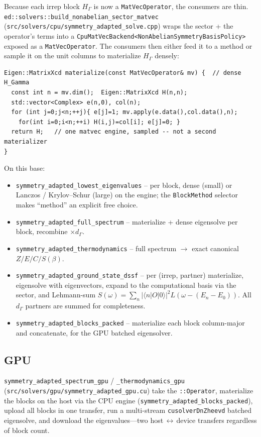\documentclass[11pt]{article}
\newcommand{\code}[1]{\texttt{\small #1}}
\newcommand{\file}[1]{\texttt{\footnotesize #1}}
\begin{document}
Because each irrep block $H_\Gamma$ is now a \code{MatVecOperator}, the
consumers are thin. \code{ed::solvers::build\_nonabelian\_sector\_matvec}
(\file{src/solvers/cpu/symmetry\_adapted\_solve.cpp}) wraps the sector +
the operator's terms into a \code{CpuMatVecBackend<NonAbelianSymmetry\-BasisPolicy>}
exposed as a \code{MatVecOperator}. The consumers then either feed it to a
method or sample it on the unit columns to materialize $H_\Gamma$ densely:
\begin{lstlisting}
Eigen::MatrixXcd materialize(const MatVecOperator& mv) {  // dense H_Gamma
  const int n = mv.dim();  Eigen::MatrixXcd H(n,n);
  std::vector<Complex> e(n,0), col(n);
  for (int j=0;j<n;++j){ e[j]=1; mv.apply(e.data(),col.data(),n);
    for(int i=0;i<n;++i) H(i,j)=col[i]; e[j]=0; }
  return H;   // one matvec engine, sampled -- not a second materializer
}
\end{lstlisting}
On this base:
\begin{itemize}[nosep]
  \item \code{symmetry\_adapted\_lowest\_eigenvalues} -- per block, dense
  (small) or Lanczos / Krylov--Schur (large) on the engine; the
  \code{BlockMethod} selector makes ``method'' an explicit free choice.
  \item \code{symmetry\_adapted\_full\_spectrum} -- materialize + dense
  eigensolve per block, recombine $\times d_\Gamma$.
  \item \code{symmetry\_adapted\_thermodynamics} -- full spectrum
  $\to$ exact canonical $Z/E/C/S(\beta)$.
  \item \code{symmetry\_adapted\_ground\_state\_dssf} -- per (irrep,
  partner) materialize, eigensolve with eigenvectors, expand to the
  computational basis via the sector, and Lehmann-sum
  $S(\omega)=\sum_n|\langle n|O|0\rangle|^2 L(\omega-(E_n-E_0))$. All
  $d_\Gamma$ partners are summed for completeness.
  \item \code{symmetry\_adapted\_blocks\_packed} -- materialize each block
  column-major and concatenate, for the GPU batched eigensolver.
\end{itemize}

\subsection{GPU}
\code{symmetry\_adapted\_spectrum\_gpu} / \code{\_thermodynamics\_gpu}
(\file{src/solvers/gpu/symmetry\_adapted\_gpu.cu}) take the
\code{::Operator}, materialize the blocks on the host via the CPU engine
(\code{symmetry\_adapted\_blocks\_packed}), upload all blocks in one
transfer, run a multi-stream \code{cusolverDnZheevd} batched eigensolve,
and download the eigenvalues---two host\,$\leftrightarrow$\,device
transfers regardless of block count.
\end{document}
